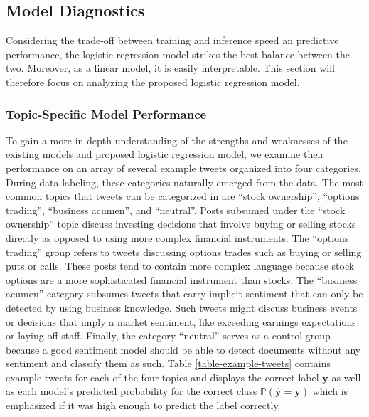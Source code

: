 \subsection{Model Diagnostics}
Considering the trade-off between training and inference speed an predictive performance, the logistic regression model strikes the best balance between the two. Moreover, as a linear model, it is easily interpretable. This section will therefore focus on analyzing the proposed logistic regression model.

\subsubsection{Topic-Specific Model Performance}
To gain a more in-depth understanding of the strengths and weaknesses of the existing models and proposed logistic regression model, we examine their performance on an array of several example tweets organized into four categories. During data labeling, these categories naturally emerged from the data. The most common topics that tweets can be categorized in are ``stock ownership'', ``options trading'', ``business acumen'', and ``neutral''. Posts subsumed under the ``stock ownership'' topic discuss investing decisions that involve buying or selling stocks directly as opposed to using more complex financial instruments. The ``options trading'' group refers to tweets discussing options trades such as buying or selling puts or calls. These posts tend to contain more complex language because stock options are a more sophisticated financial instrument than stocks. The ``business acumen'' category subsumes tweets that carry implicit sentiment that can only be detected by using business knowledge. Such tweets might discuss business events or decisions that imply a market sentiment, like exceeding earnings expectations or laying off staff. Finally, the category ``neutral'' serves as a control group because a good sentiment model should be able to detect documents without any sentiment and classify them as such. Table \ref{table-example-tweets} contains example tweets for each of the four topics and displays the correct label $\bm{y}$ as well as each model's predicted probability for the correct class $\bm{\mathbb{P}(\hat y = y)}$ which is emphasized if it was high enough to predict the label correctly.




